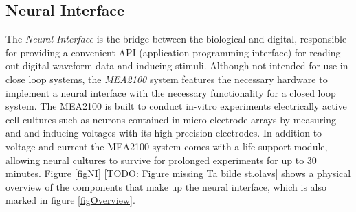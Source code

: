 \subsection{Neural Interface}
The \emph{Neural Interface} is the bridge between the biological and digital,
responsible for providing a convenient API (application programming interface)
for reading out digital waveform data and inducing stimuli.
Although not intended for use in close loop systems, the \textit{MEA2100}
system features the necessary hardware to implement a neural interface with the
necessary functionality for a closed loop system.
The MEA2100 is built to conduct in-vitro experiments electrically active cell
cultures such as neurons contained in micro electrode arrays by measuring and
and inducing voltages with its high precision electrodes.
In addition to voltage and current the MEA2100 system comes with a life support
module, allowing neural cultures to survive for prolonged experiments for up to
30 minutes.
Figure \ref{figNI} [TODO: Figure missing Ta bilde st.olavs] shows a physical overview of the components that make up the
neural interface, which is also marked in figure \ref{figOverview}.
